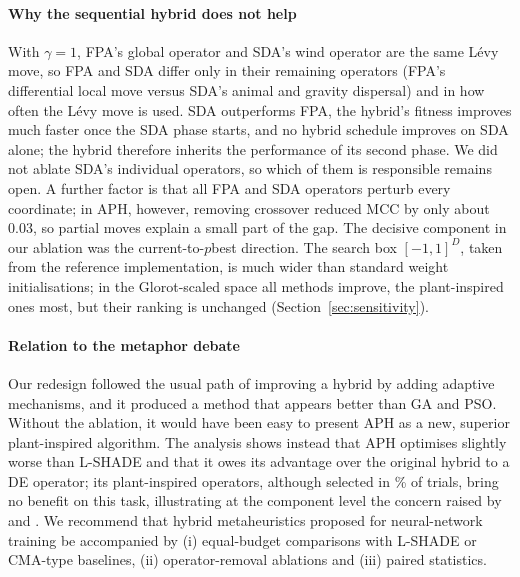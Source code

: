 \documentclass[10pt,letterpaper]{article}
\begin{document}
\paragraph{Why the sequential hybrid does not help} With $\gamma=1$, FPA's global operator and SDA's wind operator are the same Lévy move, so FPA and SDA differ only in their remaining operators (FPA's differential local move versus SDA's animal and gravity dispersal) and in how often the Lévy move is used. SDA outperforms FPA, the hybrid's fitness improves much faster once the SDA phase starts, and no hybrid schedule improves on SDA alone; the hybrid therefore inherits the performance of its second phase. We did not ablate SDA's individual operators, so which of them is responsible remains open. A further factor is that all FPA and SDA operators perturb every coordinate; in APH, however, removing crossover reduced MCC by only about 0.03, so partial moves explain a small part of the gap. The decisive component in our ablation was the current-to-$p$best direction. The search box $[-1,1]^D$, taken from the reference implementation, is much wider than standard weight initialisations; in the Glorot-scaled space all methods improve, the plant-inspired ones most, but their ranking is unchanged (Section~\ref{sec:sensitivity}).

\paragraph{Relation to the metaphor debate} Our redesign followed the usual path of improving a hybrid by adding adaptive mechanisms, and it produced a method that appears better than GA and PSO. Without the ablation, it would have been easy to present APH as a new, superior plant-inspired algorithm. The analysis shows instead that APH optimises slightly worse than L-SHADE and that it owes its advantage over the original hybrid to a DE operator; its plant-inspired operators, although selected in \SharePlant\% of trials, bring no benefit on this task, illustrating at the component level the concern raised by \citet{sorensen2015metaphor} and \citet{camacho2023exposing}. We recommend that hybrid metaheuristics proposed for neural-network training be accompanied by (i) equal-budget comparisons with L-SHADE or CMA-type baselines, (ii) operator-removal ablations and (iii) paired statistics.
\end{document}
